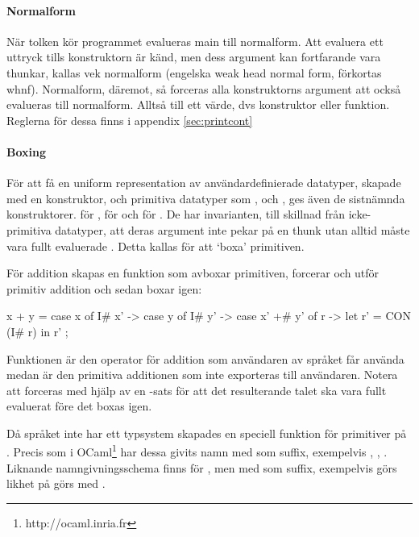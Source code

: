 \documentclass[../Core]{subfiles}
\begin{document}

\paragraph{Normalform}
\label{sec:whnf}
\label{sec:nf}

När tolken kör programmet evalueras main till normalform.
Att evaluera ett uttryck tills konstruktorn är känd, men dess argument kan 
fortfarande vara thunkar, kallas vek normalform 
(engelska weak head normal form, förkortas whnf). Normalform, däremot, så
forceras alla konstruktorns argument att också evalueras till normalform.
Alltså till ett värde, dvs konstruktor eller funktion. Reglerna för dessa
finns i appendix \ref{sec:printcont}

\paragraph{Boxing}
\label{sec:boxing}

För att få en uniform representation av användardefinierade datatyper, skapade
med en konstruktor, och primitiva datatyper som ,  och , ges även 
de sistnämnda konstruktorer.  för ,  för  och 
 för . De har invarianten, till skillnad från icke-primitiva datatyper, 
att deras argument inte pekar på en thunk utan alltid måste vara fullt evaluerade  \cite{santos}. 
Detta kallas för att `boxa' primitiven.

    För addition skapas en funktion som avboxar primitiven,
forcerar och utför primitiv addition och sedan boxar igen:

\begin{codeEx}
x + y = case x of 
    { I# x' -> case y of
        { I# y' -> case x' +# y' of
            { r -> let r' = CON (I# r) 
                   in  r'
    }   }   };
\end{codeEx}

Funktionen \ic{+} är den operator för addition som användaren av språket
får använda medan \ic{+\#} är den primitiva additionen som inte exporteras till 
användaren. Notera att 
forceras med hjälp av en -sats för att det resulterande talet ska vara fullt
evaluerat före det boxas igen.

Då språket inte har ett typsystem skapades en speciell funktion för primitiver
på . Precis som i OCaml\footnote{http://ocaml.inria.fr} har dessa
givits namn med  som suffix, exempelvis , , .
Liknande namngivningsschema finns för , men med \ic{:} som suffix,
exempelvis görs likhet på  görs med \ic{==:}.
\end{document}
